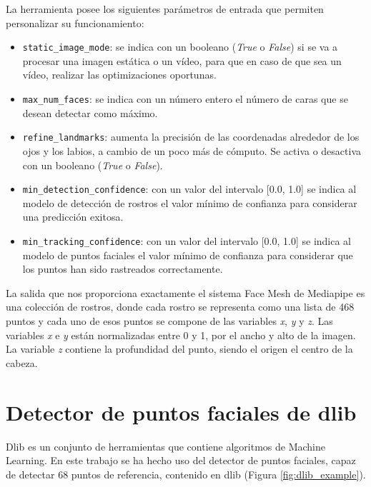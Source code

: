 La herramienta posee los siguientes parámetros de entrada que permiten personalizar su funcionamiento:
\begin{itemize}
    \item \verb|static_image_mode|: se indica con un booleano (\textit{True} o \textit{False}) si se va a procesar una imagen estática o un vídeo, para que en caso de que sea un vídeo, realizar las optimizaciones oportunas.
    
    \item \verb|max_num_faces|: se indica con un número entero el número de caras que se desean detectar como máximo.
    
    \item \verb|refine_landmarks|: aumenta la precisión de las coordenadas alrededor de los ojos y los labios, a cambio de un poco más de cómputo. Se activa o desactiva con un booleano (\textit{True} o \textit{False}).
    
    \item \verb|min_detection_confidence|: con un valor del intervalo [0.0, 1.0] se indica al modelo de detección de rostros el valor mínimo de confianza para considerar una predicción exitosa.
    
    \item \verb|min_tracking_confidence|: con un valor del intervalo [0.0, 1.0] se indica al modelo de puntos faciales el valor mínimo de confianza para considerar que los puntos han sido rastreados correctamente.
\end{itemize}

La salida que nos proporciona exactamente el sistema Face Mesh de Mediapipe es una colección de rostros, donde cada rostro se representa como una lista de 468 puntos y cada uno de esos puntos se compone de las variables \textit{x}, \textit{y} y \textit{z}. Las variables \textit{x} e \textit{y} están normalizadas entre 0 y 1, por el ancho y alto de la imagen. La variable \textit{z} contiene la profundidad del punto, siendo el origen el centro de la cabeza.

\section{Detector de puntos faciales de dlib}
\label{sec:dlib}

Dlib es un conjunto de herramientas que contiene algoritmos de Machine Learning. En este trabajo se ha hecho uso del detector de puntos faciales, capaz de detectar 68 puntos de referencia, contenido en dlib (Figura \ref{fig:dlib_example}).\\

